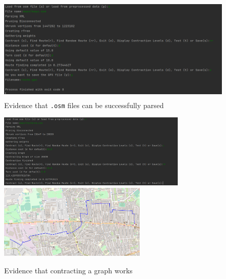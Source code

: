 \documentclass[11pt,twoside,a4paper]{report}
\begin{document}
\begin{figure}[h]
    \begin{center}
        \includegraphics[height=5cm]{parsegraph.png}
    \end{center}
    \caption{Evidence that \texttt{.osm} files can be successfully parsed}
    \label{graphparsevidence}
\end{figure}
\begin{figure}[h]
    \begin{center}
        \includegraphics[height=3.5cm]{contractiontest.png}\includegraphics[height=3.5cm]{contractionroute.png}
    \end{center}
    \caption{Evidence that contracting a graph works}
    \label{contracttestevidence}
\end{figure}
\end{document}
